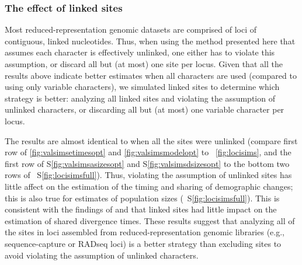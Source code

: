 \ifembed{

}{}


\subsubsection{The effect of linked sites}

Most reduced-representation genomic datasets are comprised of loci of
contiguous, linked nucleotides.
Thus, when using the method presented here that assumes each character is
effectively unlinked,
one either has to violate this assumption, or discard all but (at most) one
site per locus.
Given that all the results above indicate better estimates when all
characters are used (compared to using only variable characters), we
simulated linked sites to determine which strategy is better:
analyzing all linked sites and violating the assumption of unlinked characters,
or discarding all but (at most) one variable character per locus.

The results are almost identical to when all the sites were unlinked
(compare first row of
\figs
\ref{fig:valsimsetimesopt}
and
\ref{fig:valsimsmodelopt}
to
\fig{}~\ref{fig:locisims},
and the first row of
\figs
S\ref{fig:valsimsasizesopt}
and
S\ref{fig:valsimsdsizesopt}
to the bottom two rows of
\fig{}~S\ref{fig:locisimsfull}).
Thus, violating the assumption of unlinked sites has little
affect on the estimation of the timing and sharing of
demographic changes;
this is also true for estimates of population sizes
(\fig{}~S\ref{fig:locisimsfull}).
This is consistent with the findings of
\citet{Oaks2018ecoevolity} and
\citet{Oaks2018paic}
that linked sites had little impact on the estimation of
shared divergence times.
These results suggest that analyzing all of the sites in loci assembled from
reduced-representation genomic libraries (e.g., sequence-capture or RADseq
loci) is a better strategy than excluding sites to avoid violating the
assumption of unlinked characters.

\ifembed{

}{}


